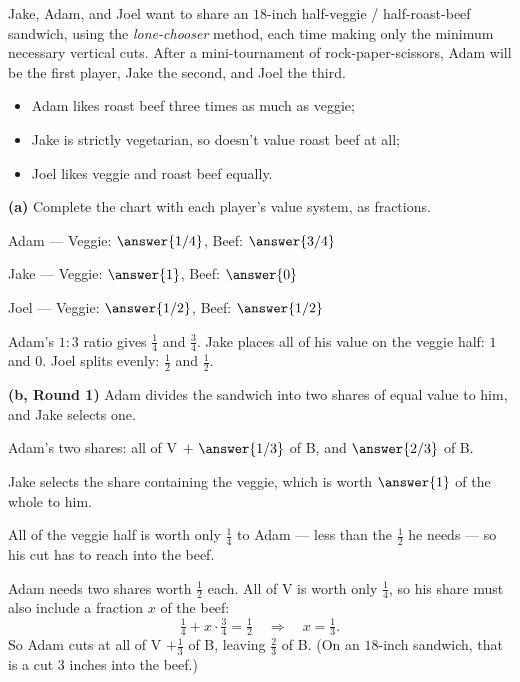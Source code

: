 \documentclass[12pt]{ximera}
\begin{document}
\begin{problem}
Jake, Adam, and Joel want to share an $18$-inch half-veggie / half-roast-beef sandwich,
using the \emph{lone-chooser} method, each time making only the minimum necessary
vertical cuts. After a mini-tournament of rock-paper-scissors, Adam will be the first player, Jake the
second, and Joel the third.
\begin{itemize}
\item Adam likes roast beef three times as much as veggie;
\item Jake is strictly vegetarian, so doesn't value roast beef at all;
\item Joel likes veggie and roast beef equally.
\end{itemize}

\begin{prompt}
\textbf{(a)} Complete the chart with each player's value system, as fractions.

Adam --- Veggie: $\answer{1/4}$, \quad Beef: $\answer{3/4}$

\smallskip
Jake --- Veggie: $\answer{1}$, \quad Beef: $\answer{0}$

\smallskip
Joel --- Veggie: $\answer{1/2}$, \quad Beef: $\answer{1/2}$

\begin{feedback}
Adam's $1:3$ ratio gives $\frac14$ and $\frac34$. Jake places all of his value on the
veggie half: $1$ and $0$. Joel splits evenly: $\frac12$ and $\frac12$.
\end{feedback}
\end{prompt}

\begin{prompt}
\textbf{(b, Round 1)} Adam divides the sandwich into two shares of equal value to him,
and Jake selects one.

Adam's two shares: all of V $+\ \answer{1/3}$ of B, \quad and \quad $\answer{2/3}$ of B.

\smallskip
Jake selects the share containing the veggie, which is worth $\answer{1}$ of the whole
to him.

\begin{hint}
All of the veggie half is worth only $\frac14$ to Adam --- less than the $\frac12$ he
needs --- so his cut has to reach into the beef.
\end{hint}

\begin{feedback}
Adam needs two shares worth $\frac12$ each. All of V is worth only $\frac14$, so his
share must also include a fraction $x$ of the beef:
\[ \tfrac14 + x\cdot\tfrac34 = \tfrac12 \quad\Longrightarrow\quad x = \tfrac13. \]
So Adam cuts at all of V $+\frac13$ of B, leaving $\frac23$ of B. (On an $18$-inch
sandwich, that is a cut $3$ inches into the beef.)


\end{feedback}
\end{prompt}
\end{problem}
\end{document}
